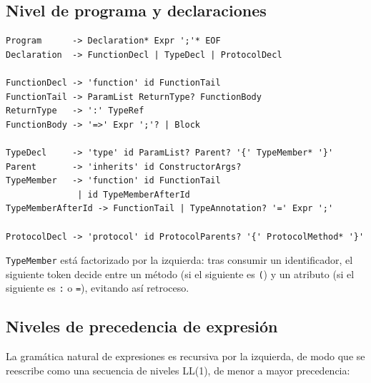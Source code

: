 \documentclass[12pt, a4paper]{article}
\begin{document}
\subsection{Nivel de programa y declaraciones}

\begin{lstlisting}[language={}]
Program      -> Declaration* Expr ';'* EOF
Declaration  -> FunctionDecl | TypeDecl | ProtocolDecl

FunctionDecl -> 'function' id FunctionTail
FunctionTail -> ParamList ReturnType? FunctionBody
ReturnType   -> ':' TypeRef
FunctionBody -> '=>' Expr ';'? | Block

TypeDecl     -> 'type' id ParamList? Parent? '{' TypeMember* '}'
Parent       -> 'inherits' id ConstructorArgs?
TypeMember   -> 'function' id FunctionTail
              | id TypeMemberAfterId
TypeMemberAfterId -> FunctionTail | TypeAnnotation? '=' Expr ';'

ProtocolDecl -> 'protocol' id ProtocolParents? '{' ProtocolMethod* '}'
\end{lstlisting}

\texttt{TypeMember} está factorizado por la izquierda: tras consumir un
identificador, el siguiente token decide entre un método (si el siguiente es
\texttt{(}) y un atributo (si el siguiente es \texttt{:} o \texttt{=}),
evitando así retroceso.

\subsection{Niveles de precedencia de expresión}

La gramática natural de expresiones es recursiva por la izquierda, de modo
que se reescribe como una secuencia de niveles LL(1), de menor a mayor
precedencia:
\end{document}
